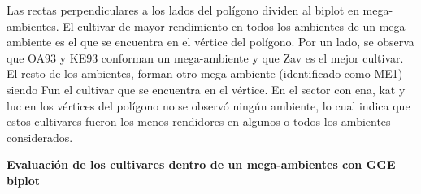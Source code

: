Las rectas perpendiculares a los lados del polígono dividen al biplot en mega-ambientes. El cultivar de mayor rendimiento en todos los ambientes de un mega-ambiente es el que se encuentra en el vértice del polígono. Por un lado, se observa que OA93 y KE93 conforman un mega-ambiente y que Zav es el mejor cultivar. El resto de los ambientes, forman otro mega-ambiente (identificado como ME1) siendo Fun el cultivar que se encuentra en el vértice. En el sector con ena, kat y luc en los vértices del polígono no se observó ningún ambiente, lo cual indica que estos cultivares fueron los menos rendidores en algunos o todos los ambientes considerados.\\


\textbf{Evaluación de los cultivares dentro de un mega-ambientes con GGE biplot}

